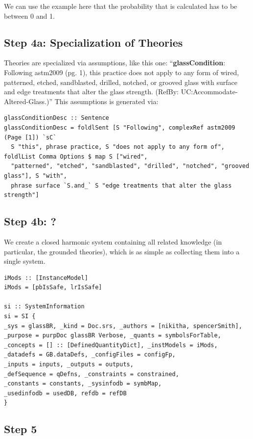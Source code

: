\documentclass[sigconf,review,anonymous=false]{acmart}
\begin{document}
We can use the example here that the probability that is calculated has to be
between 0 and 1.

\subsection*{Step 4a: Specialization of Theories}

Theories are specialized via assumptions, like this one: ``\textbf{glassCondition}:
Following astm2009 (pg. 1), this practice does not apply to any form of wired,
patterned, etched, sandblasted, drilled, notched, or grooved glass with surface
and edge treatments that alter the glass strength. (RefBy:
UC:Accommodate-Altered-Glass.)''  This assumptions is generated via:

\begin{lstlisting}
glassConditionDesc :: Sentence
glassConditionDesc = foldlSent [S "Following", complexRef astm2009 (Page [1]) `sC` 
  S "this", phrase practice, S "does not apply to any form of", foldlList Comma Options $ map S ["wired",
  "patterned", "etched", "sandblasted", "drilled", "notched", "grooved glass"], S "with", 
  phrase surface `S.and_` S "edge treatments that alter the glass strength"]
\end{lstlisting}

\subsection*{Step 4b: ?}

We create a closed harmonic system containing all related knowledge (in
particular, the grounded theories), which is as simple as collecting them into a
single system.

\begin{lstlisting}
iMods :: [InstanceModel]
iMods = [pbIsSafe, lrIsSafe]

si :: SystemInformation
si = SI {
_sys = glassBR, _kind = Doc.srs, _authors = [nikitha, spencerSmith],
_purpose = purpDoc glassBR Verbose, _quants = symbolsForTable,
_concepts = [] :: [DefinedQuantityDict], _instModels = iMods,
_datadefs = GB.dataDefs, _configFiles = configFp,
_inputs = inputs, _outputs = outputs,
_defSequence = qDefns, _constraints = constrained,
_constants = constants, _sysinfodb = symbMap,
_usedinfodb = usedDB, refdb = refDB
}
\end{lstlisting}

\subsection*{Step 5}
\end{document}
